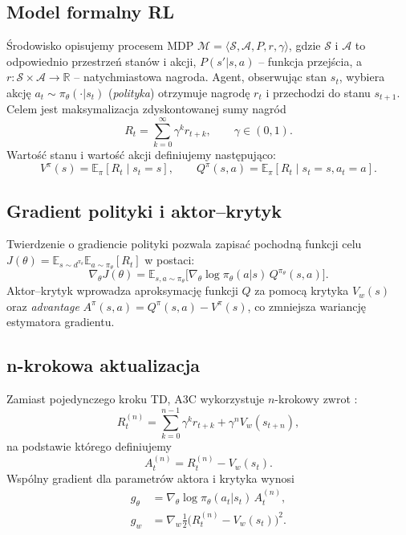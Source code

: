 \documentclass[12pt,a4paper]{article}
\newcommand{\E}{\mathbb{E}}
\newcommand{\grad}{\nabla}
\begin{document}
\subsection{Model formalny RL}

Środowisko opisujemy procesem MDP
$\mathcal{M}=\langle\mathcal{S},\mathcal{A},P,r,\gamma\rangle$,
gdzie $\mathcal{S}$ i $\mathcal{A}$ to odpowiednio przestrzeń stanów
i akcji, $P(s'|s,a)$ – funkcja przejścia, a
$r:\mathcal{S}\times\mathcal{A}\to\mathbb{R}$ – natychmiastowa nagroda.
Agent, obserwując stan $s_t$, wybiera akcję
$a_t\sim\pi_\theta(\cdot|s_t)$
(\emph{polityka})
otrzymuje nagrodę $r_t$ i przechodzi do stanu $s_{t+1}$.
Celem jest maksymalizacja zdyskontowanej sumy nagród
\[
  R_t=\sum_{k=0}^\infty \gamma^{k}r_{t+k},
  \qquad \gamma\in(0,1).
\]
Wartość stanu i wartość akcji definiujemy następująco:
\[
  V^{\pi}(s)=\E_{\pi}[R_t\mid s_t=s],
  \qquad
  Q^{\pi}(s,a)=\E_{\pi}[R_t\mid s_t=s,a_t=a].
\]

\subsection{Gradient polityki i aktor–krytyk}

Twierdzenie o gradiencie polityki
pozwala zapisać pochodną funkcji celu
$J(\theta)=\E_{s\sim d^{\pi_\theta}}\E_{a\sim\pi_\theta}[R_t]$
w postaci:
\begin{equation}
  \grad_\theta J(\theta)=
  \E_{s,a\sim\pi_\theta}
  \bigl[\grad_\theta\!\log\pi_\theta(a|s)\,Q^{\pi_\theta}(s,a)\bigr].
  \label{eq:pg}
\end{equation}
Aktor–krytyk wprowadza aproksymację funkcji $Q$ za pomocą
krytyka $V_w(s)$ oraz \emph{advantage}
$A^{\pi}(s,a)=Q^{\pi}(s,a)-V^{\pi}(s)$, co zmniejsza wariancję estymatora gradientu.

\subsection{n-krokowa aktualizacja}

Zamiast pojedynczego kroku TD, A3C wykorzystuje
$n$-krokowy zwrot
:
\[
  R^{(n)}_t
  =\sum_{k=0}^{n-1}\gamma^{k}r_{t+k}
   +\gamma^{n}V_w(s_{t+n}),
\]
na podstawie którego definiujemy
\[
  A^{(n)}_t
  =R^{(n)}_t-V_w(s_t).
\]
Wspólny gradient dla parametrów aktora i krytyka wynosi
\begin{align}
  g_\theta &= \grad_\theta\!\log\pi_\theta(a_t|s_t)\,A^{(n)}_t,\\
  g_w      &= \grad_w \tfrac12\bigl(R^{(n)}_t-V_w(s_t)\bigr)^{2}.
\end{align}
\end{document}
